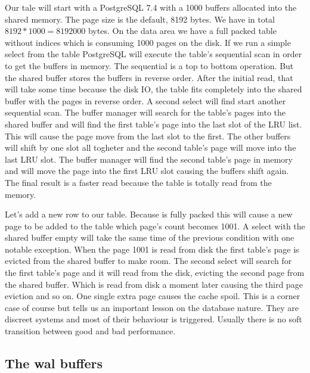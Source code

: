 Our tale will start with a PostgreSQL 7.4 with a 1000 buffers allocated into the shared memory. The page 
size is the default, 8192 bytes. We have in total \begin{math}8192 * 1000 = 8192000\end{math} bytes. On the 
data area we have a full packed table without indices which is consuming 1000 pages on the disk. If we run 
a simple select from the table PostgreSQL  will execute the table's sequential scan in order to get the 
buffers in memory. The sequential is a top to bottom operation. But the shared buffer stores the buffers in 
reverse order. After the initial read, that will take some time because the disk IO, the table fits 
completely into the shared buffer with the pages in reverse order. A second select will find start another 
sequential scan. The buffer manager will search for the table's pages into the shared buffer and will find 
the first table's page into the last slot of the LRU list. This will cause the page move from the last slot 
to the first. The other buffers will shift by one slot all togheter and the second table's page will move 
into the last LRU slot. The buffer manager will find the second table's page in memory and will move the 
page into the first LRU slot causing the buffers shift again. The final result is a faster read because the 
table is totally read from the memory.\newline

Let's add a new row to our table. Because is fully packed this will cause a new page to be added to the 
table which page's count becomes 1001. A select with the shared buffer empty will take the same time of the 
previous condition with one notable exception. When the page 1001 is read from disk the first table's page 
is evicted from the shared buffer to make room. The second select will search for the first table's page 
and it will read from the disk, evicting the second page from the shared buffer. Which is read from disk a 
moment later causing the third page eviction and so on. One single extra page causes the cache spoil. This 
is a corner case of course but tells us an important lesson on the database nature. They are discreet 
systems and most of their behaviour is triggered. Usually there is no soft transition between good and bad
performance. 

\subsection{The wal buffers}

